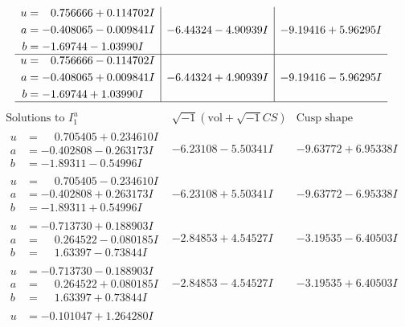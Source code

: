 \documentclass[1p]{elsarticle_modified}
\theoremstyle{definition}
\newcommand{\I}{\sqrt{-1}}
\begin{document}
$$\begin{array}{c|c|c}
\begin{aligned}
u &= \phantom{-}0.756666 + 0.114702 I \\
a &= -0.408065 - 0.009841 I \\
b &= -1.69744 - 1.03990 I\end{aligned}
 & -6.44324 - 4.90939 I & -9.19416 + 5.96295 I \\ \hline\begin{aligned}
u &= \phantom{-}0.756666 - 0.114702 I \\
a &= -0.408065 + 0.009841 I \\
b &= -1.69744 + 1.03990 I\end{aligned}
 & -6.44324 + 4.90939 I & -9.19416 - 5.96295 I\\
 \hline 
 \end{array}$$\newpage$$\begin{array}{c|c|c}  
\text{Solutions to }I^u_{1}& \I (\text{vol} + \sqrt{-1}CS) & \text{Cusp shape}\\
 \hline 
\begin{aligned}
u &= \phantom{-}0.705405 + 0.234610 I \\
a &= -0.402808 - 0.263173 I \\
b &= -1.89311 - 0.54996 I\end{aligned}
 & -6.23108 - 5.50341 I & -9.63772 + 6.95338 I \\ \hline\begin{aligned}
u &= \phantom{-}0.705405 - 0.234610 I \\
a &= -0.402808 + 0.263173 I \\
b &= -1.89311 + 0.54996 I\end{aligned}
 & -6.23108 + 5.50341 I & -9.63772 - 6.95338 I \\ \hline\begin{aligned}
u &= -0.713730 + 0.188903 I \\
a &= \phantom{-}0.264522 - 0.080185 I \\
b &= \phantom{-}1.63397 - 0.73844 I\end{aligned}
 & -2.84853 + 4.54527 I & -3.19535 - 6.40503 I \\ \hline\begin{aligned}
u &= -0.713730 - 0.188903 I \\
a &= \phantom{-}0.264522 + 0.080185 I \\
b &= \phantom{-}1.63397 + 0.73844 I\end{aligned}
 & -2.84853 - 4.54527 I & -3.19535 + 6.40503 I \\ \hline\begin{aligned}
u &= -0.101047 + 1.264280 I \\

\end{aligned}
\end{array}$$
\end{document}
